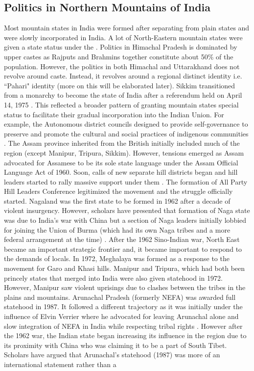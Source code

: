 \begin{sloppypar}
\subsection{Politics in Northern Mountains of India}

Most mountain states in India were formed after separating from plain states and were slowly incorporated in India. A lot of North-Eastern mountain states were given a state status under the \cite{North_eastern_reorg_1971}.  Politics in Himachal Pradesh is dominated by upper castes as  Rajputs and Brahmins together constitute about 50\% of the population. However, the politics in both Himachal and Uttarakhand does not revolve around caste. Instead, it revolves around a regional distinct identity i.e. ``Pahari" identity \citep{mishra2000politics} (more on this will be elaborated later). Sikkim transitioned from a monarchy to become the  state of India after a referendum held on April 14, 1975 \citep{code1979volume}. This reflected a broader pattern of granting mountain states special status to facilitate their gradual incorporation into the Indian Union. For example, the Autonomous district councils  designed to provide self-governance to preserve and promote the cultural and social practices of indigenous communities \citep{pautunthang2024india}. The Assam province inherited from the British initially included much of the region (except Manipur, Tripura, Sikkim). However, tensions emerged as Assam advocated for Assamese to be its sole state language under the Assam Official Language Act of 1960. Soon, calls of new separate hill districts began and hill leaders started to rally massive support under them \citep{inoue2005integration}. The formation of All Party Hill Leaders Conference legitimized the movement and the struggle officially started. Nagaland was the first state to be formed in 1962 after a decade of violent insurgency. However, scholars have presented that formation of Naga state was due to India's war with China but a section of Naga leaders initially lobbied for joining the Union of Burma (which had its own Naga tribes and a more federal arrangement at the time) \citep{Wouters_2023,johari1975creation}. After the 1962 Sino-Indian war, North East became an important strategic frontier and, it became important to respond to the demands of locals. In 1972, Meghalaya was formed as a response to the movement for Garo and Khasi hills. Manipur and Tripura, which had both been princely states that merged into India were also given statehood in 1972. However, Manipur saw violent uprisings due to clashes between the tribes in the plains and mountains. Arunachal Pradesh (formerly NEFA) was awarded full statehood in 1987. It followed a different trajectory as it was initially under the influence of Elvin Verrier where he advocated for leaving Arunachal alone and slow integration of NEFA in India while respecting tribal rights \citep{verrier_elvin_2008}. However after the 1962 war, the Indian state began increasing its influence in the region due to its proximity with China who was claiming it to be a part of South Tibet. Scholars have argued that Arunachal’s statehood (1987) was  more of an international statement rather than a 
\end{sloppypar}
